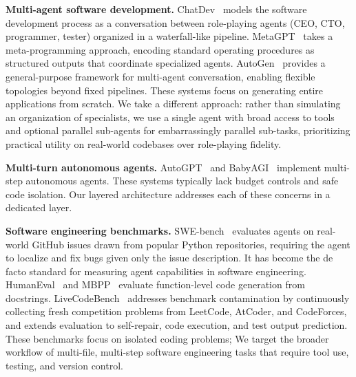 \documentclass{article}
\begin{document}
\textbf{Multi-agent software development.} ChatDev~\citep{qian2024chatdev} models the software development process as a conversation between role-playing agents (CEO, CTO, programmer, tester) organized in a waterfall-like pipeline. MetaGPT~\citep{hong2024metagpt} takes a meta-programming approach, encoding standard operating procedures as structured outputs that coordinate specialized agents. AutoGen~\citep{wu2023autogen} provides a general-purpose framework for multi-agent conversation, enabling flexible topologies beyond fixed pipelines.  These systems focus on generating entire applications from scratch.  We take a different approach: rather than simulating an organization of specialists, we use a single agent with broad access to tools and optional parallel sub-agents for embarrassingly parallel sub-tasks, prioritizing practical utility on real-world codebases over role-playing fidelity.

\textbf{Multi-turn autonomous agents.} AutoGPT~\citep{autogpt2023} and BabyAGI~\citep{babyagi2023} implement multi-step autonomous agents.  These systems typically lack budget controls and safe code isolation.  Our layered architecture addresses each of these concerns in a dedicated layer.

\textbf{Software engineering benchmarks.} SWE-bench~\citep{jimenez2024swebench} evaluates agents on real-world GitHub issues drawn from popular Python repositories, requiring the agent to localize and fix bugs given only the issue description. It has become the de facto standard for measuring agent capabilities in software engineering. HumanEval~\citep{chen2021evaluating} and MBPP~\citep{austin2021program} evaluate function-level code generation from docstrings. LiveCodeBench~\citep{jain2024livecodebench} addresses benchmark contamination by continuously collecting fresh competition problems from LeetCode, AtCoder, and CodeForces, and extends evaluation to self-repair, code execution, and test output prediction.  These benchmarks focus on isolated coding problems; We target the broader workflow of multi-file, multi-step software engineering tasks that require tool use, testing, and version control.
\end{document}
